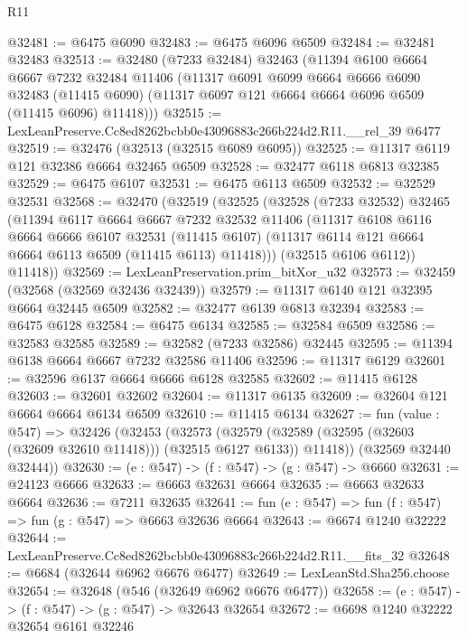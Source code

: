 \begin{lexlean}{R11}
\begin{coremodule}
@32481 := @6475 @6090
@32483 := @6475 @6096 @6509
@32484 := @32481 @32483
@32513 := @32480
    (@7233 @32484)
    @32463
    (@11394
      @6100
      @6664
      @6667
      @7232
      @32484
      @11406
      (@11317
        @6091
        @6099
        @6664
        @6666
        @6090
        @32483
        (@11415 @6090)
        (@11317 @6097 @121 @6664 @6664 @6096 @6509 (@11415 @6096) @11418)))
@32515 := LexLeanPreserve.Cc8ed8262bcbb0e43096883c266b224d2.R11.__rel_39 @6477
@32519 := @32476 (@32513 (@32515 @6089 @6095))
@32525 := @11317 @6119 @121 @32386 @6664 @32465 @6509
@32528 := @32477 @6118 @6813 @32385
@32529 := @6475 @6107
@32531 := @6475 @6113 @6509
@32532 := @32529 @32531
@32568 := @32470
    (@32519
      (@32525
        (@32528
          (@7233 @32532)
          @32465
          (@11394
            @6117
            @6664
            @6667
            @7232
            @32532
            @11406
            (@11317
              @6108
              @6116
              @6664
              @6666
              @6107
              @32531
              (@11415 @6107)
              (@11317 @6114 @121 @6664 @6664 @6113 @6509 (@11415 @6113) @11418)))
          (@32515 @6106 @6112))
        @11418))
@32569 := LexLeanPreservation.prim_bitXor_u32
@32573 := @32459 (@32568 (@32569 @32436 @32439))
@32579 := @11317 @6140 @121 @32395 @6664 @32445 @6509
@32582 := @32477 @6139 @6813 @32394
@32583 := @6475 @6128
@32584 := @6475 @6134
@32585 := @32584 @6509
@32586 := @32583 @32585
@32589 := @32582 (@7233 @32586) @32445
@32595 := @11394 @6138 @6664 @6667 @7232 @32586 @11406
@32596 := @11317 @6129
@32601 := @32596 @6137 @6664 @6666 @6128 @32585
@32602 := @11415 @6128
@32603 := @32601 @32602
@32604 := @11317 @6135
@32609 := @32604 @121 @6664 @6664 @6134 @6509
@32610 := @11415 @6134
@32627 := fun (value : @547) =>
  @32426
    (@32453
      (@32573
        (@32579 (@32589 (@32595 (@32603 (@32609 @32610 @11418))) (@32515 @6127 @6133)) @11418))
      (@32569 @32440 @32444))
@32630 := (e : @547) -> (f : @547) -> (g : @547) -> @6660
@32631 := @24123 @6666
@32633 := @6663 @32631 @6664
@32635 := @6663 @32633 @6664
@32636 := @7211 @32635
@32641 := fun (e : @547) => fun (f : @547) => fun (g : @547) => @6663 @32636 @6664
@32643 := @6674 @1240 @32222
@32644 := LexLeanPreserve.Cc8ed8262bcbb0e43096883c266b224d2.R11.__fits_32
@32648 := @6684 (@32644 @6962 @6676 @6477)
@32649 := LexLeanStd.Sha256.choose
@32654 := @32648 (@546 (@32649 @6962 @6676 @6477))
@32658 := (e : @547) -> (f : @547) -> (g : @547) -> @32643 @32654
@32672 := @6698
    @1240
    @32222
    @32654
    @6161
    @32246

\end{coremodule}
\end{lexlean}
